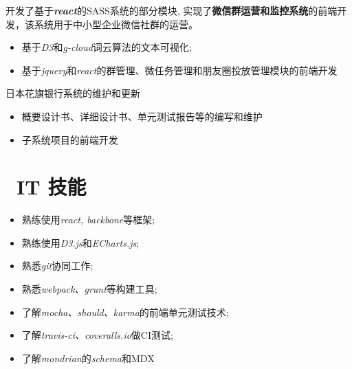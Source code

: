 \documentclass{resume}
\begin{document}
\begin{onehalfspacing}
开发了基于\textit{\textbf{react}}的SASS系统的部分模块, 实现了\textbf{微信群运营和监控系统}的前端开发，该系统用于中小型企业微信社群的运营。

\begin{itemize}
  \item 基于\textit{D3}和\textit{g-cloud}词云算法的文本可视化;
  \item 基于\textit{jquery}和\textit{react}的群管理、微任务管理和朋友圈投放管理模块的前端开发
\end{itemize}
\end{onehalfspacing}

\begin{onehalfspacing}
日本花旗银行系统的维护和更新
\begin{itemize}
  \item 概要设计书、详细设计书、单元测试报告等的编写和维护
  \item 子系统项目的前端开发
\end{itemize}
\end{onehalfspacing}

\section{\faCogs\ IT 技能}
\begin{itemize}[parsep=0.5ex]
  \item 熟练使用\textit{react, backbone}等框架;
  \item 熟练使用\textit{D3.js}和\textit{ECharts.js};
  \item 熟悉\textit{git}协同工作;
  \item 熟悉\textit{webpack、grunt}等构建工具;
  \item 了解\textit{mocha、should、karma}的前端单元测试技术;
  \item 了解\textit{travis-ci、coveralls.io}做CI测试;
  \item 了解\textit{mondrian}的\textit{schema}和MDX
\end{itemize}
\end{document}
